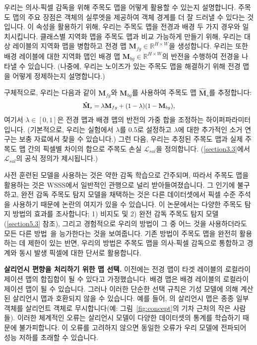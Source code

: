 \documentclass[final]{cvpr}
\begin{document}
우리는 의사-픽셀 감독을 위해 주목도 맵을 어떻게 활용할 수 있는지 설명합니다. 주목도 맵의 주요 장점은 객체의 실루엣을 제공하여 객체 경계를 더 잘 드러낼 수 있다는 것입니다. 이 속성을 활용하기 위해, 우리는 주목도 맵을 전경과 배경 두 가지 경우와 일치시킵니다. 클래스별 지역화 맵을 주목도 맵과 비교 가능하게 만들기 위해, 우리는 대상 레이블의 지역화 맵을 병합하고 전경 맵 $\mathbf{M}_{fg} \in \mathbb{R}^{H \times W}$을 생성합니다. 우리는 또한 배경 레이블에 대한 지역화 맵인 배경 맵 $\mathbf{M}_{bg} \in \mathbb{R}^{H \times W}$의 반전을 수행하여 전경을 나타낼 수 있습니다. (나중에, 우리는 노이즈가 있는 주목도 맵을 해결하기 위해 전경 맵을 어떻게 정제하는지 설명합니다.)

구체적으로, 우리는 다음과 같이 $\mathbf{M}_{fg}$와 $\mathbf{M}_{bg}$를 사용하여 주목도 맵 $\mathbf{\hat{M}}_{s}$를 추정합니다:\vspace{-1mm}
\begin{equation}
\label{eq_esimate_sal}
{\small
\begin{split}
\mathbf{\hat{M}}_{s} = \lambda\mathbf{M}_{fg} + (1-\lambda)(1-\mathbf{M}_{bg}),
\end{split}}\vspace{-1mm}
\end{equation}
\noindent 여기서 $\lambda \in [0, 1]$은 전경 맵과 배경 맵의 반전의 가중 합을 조정하는 하이퍼파라미터입니다. (기본적으로, 우리는 실험에서 $\lambda$를 0.5로 설정하고 $\lambda$에 대한 추가적인 소거 연구는 보충 자료에서 찾을 수 있습니다.) 그런 다음, 우리는 추정된 주목도 맵과 실제 주목도 맵 간의 픽셀별 차이의 합으로 주목도 손실 $\mathcal{L}_{sal}$을 정의합니다. (\ref{section3.3}에서 $\mathcal{L}_{sal}$의 공식 정의가 제시됩니다.)

사전 훈련된 모델을 사용하는 것은 약한 감독 학습으로 간주되며, 따라서 주목도 맵을 활용하는 것은 WSSS에서 일반적인 관행으로 널리 받아들여졌습니다. 그 인기에 불구하고, 완전 감독 주목도 탐지 모델을 채택하는 것은 다른 데이터셋에서 픽셀 수준 주석을 사용하기 때문에 논란의 여지가 있을 수 있습니다. 이 논문에서는 다양한 주목도 탐지 방법의 효과를 조사합니다; 1) 비지도 및 2) 완전 감독 주목도 탐지 모델 (\ref{section5.3} 참조), 그리고 경험적으로 우리의 방법이 그 중 어느 것을 사용하더라도 모든 다른 방법~\cite{fan2020learning,jiang2019integral,wang2018weakly, wei2016stc,yao2020saliency}을 능가한다는 것을 보여줍니다. 기존 방법이 주목도 맵을 완전히 활용하는 데 제한이 있는 반면, 우리의 방법은 주목도 맵을 의사-픽셀 감독으로 통합하고 경계와 동시 발생 픽셀에 대한 단서로 활용합니다.

\vspace{1mm}
\noindent\textbf{살리언시 편향을 처리하기 위한 맵 선택.} 이전에는 전경 맵이 타겟 레이블의 로컬라이제이션 맵의 합집합이 될 수 있다고 가정했습니다. 배경 맵은 배경 레이블의 로컬라이제이션 맵이 될 수 있습니다. 그러나 이러한 단순한 선택 규칙은 기성 모델에 의해 계산된 살리언시 맵과 호환되지 않을 수 있습니다. 예를 들어, \cite{zhao2019pyramid}의 살리언시 맵은 종종 일부 객체를 살리언트 객체로 무시합니다(예: 그림~\ref{fig:concept}의 기차 근처의 작은 사람들). 이러한 체계적인 오류는 살리언시 모델이 다양한 데이터셋의 통계를 학습하기 때문에 불가피합니다. 이 오류를 고려하지 않으면 동일한 오류가 우리 모델에 전파되어 성능 저하를 초래할 수 있습니다.
\end{document}
